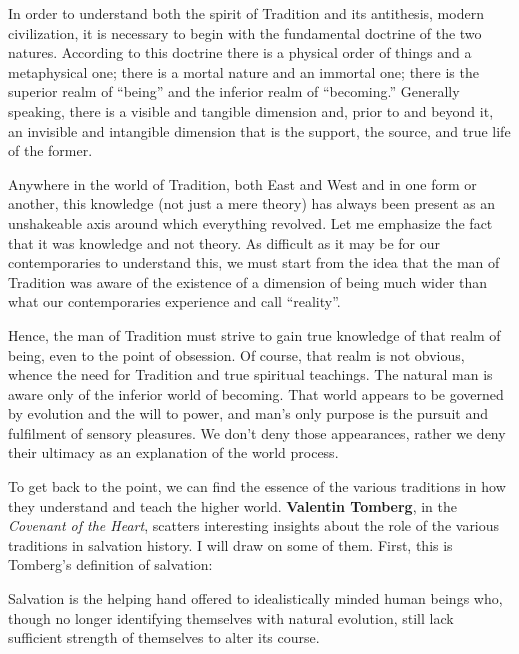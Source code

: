 \begin{quotationx}
In order to understand both the spirit of Tradition and its antithesis, modern civilization, it is necessary to begin with the fundamental doctrine of the two natures. According to this doctrine there is a physical order of things and a metaphysical one; there is a mortal nature and an immortal one; there is the superior realm of ``being'' and the inferior realm of ``becoming.'' Generally speaking, there is a visible and tangible dimension and, prior to and beyond it, an invisible and intangible dimension that is the support, the source, and true life of the former.

Anywhere in the world of Tradition, both East and West and in one form or another, this knowledge (not just a mere theory) has always been present as an unshakeable axis around which everything revolved. Let me emphasize the fact that it was knowledge and not theory. As difficult as it may be for our contemporaries to understand this, we must start from the idea that the man of Tradition was aware of the existence of a dimension of being much wider than what our contemporaries experience and call ``reality''.
\end{quotationx}


Hence, the man of Tradition must strive to gain true knowledge of that realm of being, even to the point of obsession. Of course, that realm is not obvious, whence the need for Tradition and true spiritual teachings. The natural man is aware only of the inferior world of becoming. That world appears to be governed by evolution and the will to power, and man's only purpose is the pursuit and fulfilment of sensory pleasures. We don't deny those appearances, rather we deny their ultimacy as an explanation of the world process.

To get back to the point, we can find the essence of the various traditions in how they understand and teach the higher world. \textbf{Valentin Tomberg}, in the \emph{Covenant of the Heart}, scatters interesting insights about the role of the various traditions in salvation history. I will draw on some of them. First, this is Tomberg's definition of salvation:

\begin{quotex}
Salvation is the helping hand offered to idealistically minded human beings who, though no longer identifying themselves with natural evolution, still lack sufficient strength of themselves to alter its course.
\end{quotex}


